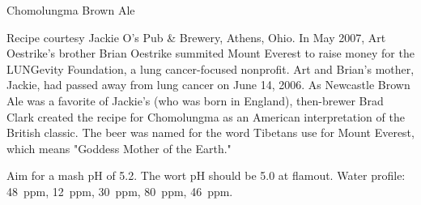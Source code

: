 \stylesection{\stylespecialtybeer}

\begin{recipie}{Chomolungma Brown Ale}

\begin{aboutblock}
Recipe courtesy Jackie O's Pub \& Brewery, Athens, Ohio.
In May 2007, Art Oestrike's brother Brian Oestrike summited Mount Everest
to raise money for the LUNG\-evity Foundation, a lung cancer-focused nonprofit.
Art and Brian's mother, Jackie, had passed away from lung cancer on June 14, 2006.
As Newcastle Brown Ale was a favorite of Jackie's (who was born in England),
then-brewer Brad Clark created the recipe for Chomolungma as an American
interpretation of the British classic. The beer was named for the word Tibetans
use for Mount Everest, which means "Goddess Mother of the Earth."
\end{aboutblock}


\begin{methodandtiming}
 
\begin{mashsteps}
\end{mashsteps}

\begin{fermentationsteps}
\end{fermentationsteps}

\begin{directions}
Aim for a mash pH of 5.2. The wort pH should be 5.0 at
flamout. Water profile:  48~ppm,  12~ppm,  30~ppm,
 80~ppm,  46~ppm.
\end{directions}

\end{methodandtiming}

\pagebreak

\begin{ingredientsblock}

\begin{malts}
\end{malts}

\begin{hops}
\end{hops}

\begin{yeasts}
\end{yeasts}

\end{ingredientsblock}

\end{recipie}